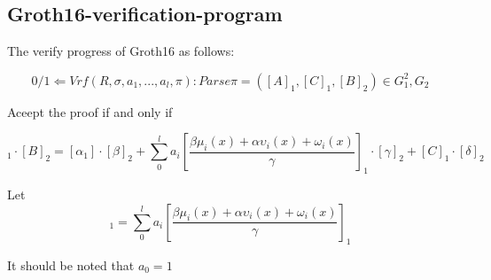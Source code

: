 \subsection{Groth16-verification-program}

The verify progress of Groth16\cite{website:Groth16} as follows:

\begin{equation}
0/1 \Leftarrow Vrf(R,\sigma, a_{1},...,a_{l}, \pi): Parse \pi = ([A]_{1}, [C]_{1}, [B]_{2}) \in G_1^2, G_2
\end{equation}

Aceept the proof if and only if

\begin{equation}
 [A]_1 \cdot [B]_2 = [\alpha_1] \cdot [\beta]_2 + \sum_{0}^{l}a_i[\frac{\beta\mu_i(x) + \alpha\upsilon_i(x) + \omega_i(x)}{\gamma}]_1 \cdot [\gamma]_2 + [C]_1 \cdot [\delta]_2  
\end{equation}


Let \begin{equation}  [msm]_1 = \sum_{0}^{l}a_i[\frac{\beta\mu_i(x) + \alpha\upsilon_i(x) + \omega_i(x)}{\gamma}]_1 \end{equation}



It should be noted that $a_0 = 1$ 